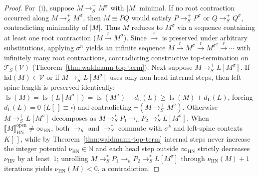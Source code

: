 \documentclass[11pt,reqno]{amsart}
\numberwithin{equation}{section}
\theoremstyle{plain}
\theoremstyle{definition}
\theoremstyle{remark}
\DeclareMathOperator{\ls}{ls}
\newcommand{\TSV}{\mathcal{T}_S(\mathcal{V})}
\newcommand{\HN}{\mathrm{HN}}
\newcommand{\sem}[1]{\llbracket #1 \rrbracket}
\newcommand{\redSp}{\to_S^+}
\newcommand{\redSs}{\to_S^*}
\begin{document}
\begin{proof}
For~(i), suppose $M \redSp M^\sigma$ with $|M|$ minimal. If no root contraction occurred along $M \redSp M^\sigma$, then $M \equiv P Q$ would satisfy $P \redSp P^\sigma$ or $Q \redSp Q^\sigma$, contradicting minimality of $|M|$. Thus $M$ reduces to $M^\sigma$ via a sequence containing at least one root contraction ($M \xrightarrow{r} M^\sigma$). Since $\xrightarrow{r}$ is preserved under arbitrary substitutions, applying $\sigma^n$ yields an infinite sequence $M \xrightarrow{r} M^\sigma \xrightarrow{r} M^{\sigma^2} \xrightarrow{r} \cdots$ with infinitely many root contractions, contradicting constructive top-termination on $\TSV$ (Theorem~\ref{thm:waldmann-top-term}). Next suppose $M \redSp L[M^\sigma]$. If $\mathrm{hd}(M) \in \mathcal{V}$ or if $M \redSp L[M^\sigma]$ uses only non-head internal steps, then left-spine length is preserved identically: $\ls(M) = \ls(L[M^\sigma]) = \ls(M^\sigma) + d_{\mathrm{L}}(L) \ge \ls(M) + d_{\mathrm{L}}(L)$, forcing $d_{\mathrm{L}}(L) = 0$ ($L[\,] \equiv \square$) and contradicting $\neg(M \redSp M^\sigma)$. Otherwise $M \redSp L[M^\sigma]$ decomposes as $M \redSs P_1 \to_h P_2 \redSs L[M^\sigma]$. When $\sem{M}_{\HN}^{\mathrm{open}} \ne \infty_{\HN}$, both $\to_h$ and $\redSs$ commute with $\sigma^k$ and left-spine contexts $K[\,]$, while by Theorem~\ref{thm:waldmann-top-term} internal steps never increase the integer potential $\nu_{\HN} \in \mathbb{N}$ and each head step outside $\infty_{\HN}$ strictly decreases $\nu_{\HN}$ by at least~$1$; unrolling $M \redSs P_1 \to_h P_2 \redSs L[M^\sigma]$ through $\nu_{\HN}(M) + 1$ iterations yields $\nu_{\HN}(M) < 0$, a contradiction.


\end{proof}
\end{document}

